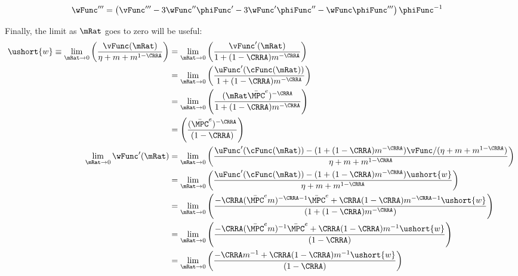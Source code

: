 \documentclass{\handout}
\begin{document}
\begin{CDCPrivate}
\begin{equation}\begin{gathered}\begin{aligned}
  \wFunc^{\prime\prime\prime} & =   \left(\vFunc^{\prime\prime\prime}-3 \wFunc^{\prime\prime} \phiFunc^{\prime} - 3 \wFunc^{\prime} \phiFunc^{\prime\prime}- \wFunc \phiFunc^{\prime\prime\prime}\right)\phiFunc^{-1} 
\end{aligned}\end{gathered}\end{equation}

Finally, the limit as $\mRat$ goes to zero will be useful:
\begin{equation}\begin{gathered}\begin{aligned}
\ushort{w} \equiv  \lim_{\mRat \rightarrow 0} \left(\frac{\vFunc(\mRat)}{\eta+m+m^{1-\CRRA}}\right) & =  \lim_{\mRat \rightarrow 0} \left(\frac{\vFunc^{\prime}(\mRat)}{1+(1-\CRRA)m^{-\CRRA}}\right)
\\ & =  \lim_{\mRat \rightarrow 0} \left(\frac{\uFunc^{\prime}(\cFunc(\mRat))}{1+(1-\CRRA)m^{-\CRRA}}\right)
\\ & =   \lim_{\mRat \rightarrow 0} \left(\frac{(\mRat \bar{\MPC}^{e})^{-\CRRA}}{1+(1-\CRRA)m^{-\CRRA}}\right)
\\ & =    \left(\frac{(\bar{\MPC}^{e})^{-\CRRA}}{(1-\CRRA)}\right)
\\ \lim_{\mRat \rightarrow 0} \wFunc^{\prime}(\mRat) & =  \lim_{\mRat \rightarrow 0} \left(\frac{\uFunc^{\prime}(\cFunc(\mRat)) -  (1+(1-\CRRA)m^{-\CRRA})\vFunc/(\eta + m + m^{1-\CRRA})}{\eta + m + m^{1-\CRRA}}\right)
\\  & =  \lim_{\mRat \rightarrow 0} \left(\frac{\uFunc^{\prime}(\cFunc(\mRat)) -  (1+(1-\CRRA)m^{-\CRRA})\ushort{w}}{\eta + m + m^{1-\CRRA}}\right)
\\  & =  \lim_{\mRat \rightarrow 0} \left(\frac{-\CRRA (\bar{\MPC}^{e} m)^{-\CRRA-1}\bar{\MPC}^{e} +  \CRRA(1-\CRRA)m^{-\CRRA-1}\ushort{w}}{(1 + (1-\CRRA) m^{-\CRRA})}\right)
\\  & =  \lim_{\mRat \rightarrow 0} \left(\frac{-\CRRA (\bar{\MPC}^{e} m)^{-1}\bar{\MPC}^{e} +  \CRRA(1-\CRRA)m^{-1}\ushort{w}}{(1-\CRRA) }\right)
\\  & =  \lim_{\mRat \rightarrow 0} \left(\frac{-\CRRA m^{-1} +  \CRRA(1-\CRRA)m^{-1}\ushort{w}}{(1-\CRRA) }\right)
\end{aligned}\end{gathered}\end{equation}



\end{CDCPrivate}
\end{document}
